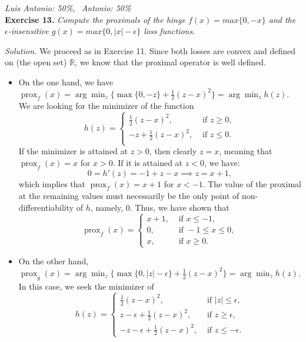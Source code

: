 \documentclass[12pt]{article}
\begin{document}
\vspace{.5em}

\textit{Luis Antonio: 50\%}, \ \textit{Antonio: 50\%}\\
\textbf{Exercise 13. }\emph{Compute the proximals of the hinge \( f(x) = max\{0, -x\}  \) and the \( \epsilon \)-insensitive \( g(x)=max\{0, |x| - \epsilon\} \) loss functions}.

\emph{Solution.} We proceed as in Exercise 11. Since both losses are convex and defined on (the open set) $\mathbb R$, we know that the proximal operator is well defined.
\begin{itemize}
    \item On the one hand, we have \( \operatorname{prox}_f(x) = \arg\min_z\{\max\{0, -z\} + \frac{1}{2} (z - x)^2 \} = \arg\min_z h(z) \). We are looking for the minimizer of the function
        \[
             h(z) = \begin{cases}
                 \frac{1}{2} (z - x)^2, &\text{ if } z \geq 0,\\
                -z + \frac{1}{2} (z - x)^2, &\text{ if } z \leq 0.\\
             \end{cases}
        \]
        If the minimizer is attained at $z> 0$, then clearly $z=x$, meaning that $\operatorname{prox}_f(x)=x$ for $x> 0$. If it is attained at $z<0$, we have:
        \[
        0=h'(z)= -1 + z - x \implies z = x+1,
        \]
        which implies that $\operatorname{prox}_f(x)=x+1$ for $x< -1$. The value of the proximal at the remaining values must necessarily be the only point of non-differentiability of $h$, namely, $0$. Thus, we have shown that
        \[
             \operatorname{prox}_f(x)= \begin{cases}
             x+1, & \text{ if } x\leq -1,\\
               0, & \text{ if } -1 \leq x \leq 0,\\
              x, & \text{ if } x \geq 0.
           \end{cases}
        \]
    \item On the other hand, \( \operatorname{prox}_g(x) = \arg\min_z\{\max\{0, |z| -\epsilon\} + \frac{1}{2} (z - x)^2 \} = \arg\min_z h(z) \). In this case, we seek the minimizer of
        \[
             h(z)= \begin{cases}
                \frac{1}{2} (z - x)^2, &\text{ if } |z| \leq \epsilon,\\
                z - \epsilon + \frac{1}{2} (z - x)^2, &\text{ if }   z \geq \epsilon,\\
                -z - \epsilon + \frac{1}{2} (z - x)^2, &\text{ if }   z \leq -\epsilon.
             \end{cases}
        \]


\end{itemize}
\end{document}
